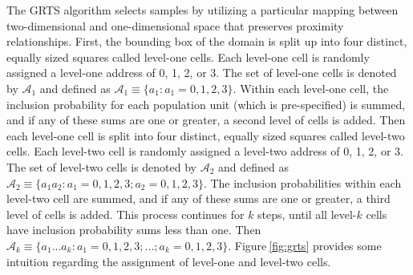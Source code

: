 \documentclass[]{elsarticle} %
\begin{document}
The GRTS algorithm selects samples by utilizing a particular mapping
between two-dimensional and one-dimensional space that preserves
proximity relationships. First, the bounding box of the domain is split
up into four distinct, equally sized squares called level-one cells.
Each level-one cell is randomly assigned a level-one address of 0, 1, 2,
or 3. The set of level-one cells is denoted by \(\mathcal{A}_1\) and
defined as \(\mathcal{A}_1 \equiv \{a_1: a_1 = 0, 1, 2, 3\}\). Within
each level-one cell, the inclusion probability for each population unit
(which is pre-specified) is summed, and if any of these sums are one or
greater, a second level of cells is added. Then each level-one cell is
split into four distinct, equally sized squares called level-two cells.
Each level-two cell is randomly assigned a level-two address of 0, 1, 2,
or 3. The set of level-two cells is denoted by \(\mathcal{A}_2\) and
defined as
\(\mathcal{A}_2 \equiv \{a_1a_2: a_1 = 0, 1, 2, 3; a_2 = 0, 1, 2, 3\}\).
The inclusion probabilities within each level-two cell are summed, and
if any of these sums are one or greater, a third level of cells is
added. This process continues for \(k\) steps, until all level-\(k\)
cells have inclusion probability sums less than one. Then
\(\mathcal{A}_k \equiv \{a_1...a_k : a_1 = 0, 1, 2, 3; ...; a_k = 0, 1, 2, 3\}\).
Figure\(~\)\ref{fig:grts} provides some intuition regarding the
assignment of level-one and level-two cells.
\end{document}
